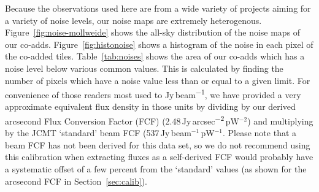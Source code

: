 \documentclass[twocolumn,times]{aastex6}
\newcommand{\jyas}{Jy\,arcsec\textsuperscript{$-$2}}
\begin{document}
Because the observations used here are from a wide variety of projects
aiming for a variety of noise levels, our noise maps are extremely
heterogenous. Figure~\ref{fig:noise-mollweide} shows the all-sky
distribution of the noise maps of our
co-adds. Figure~\ref{fig:histonoise} shows a histogram of the noise in
each pixel of the co-added tiles. Table~\ref{tab:noises} shows the area
of our co-adds which has a noise level below various common
values. This is calculated by finding the number of pixels which have
a noise value less than or equal to a given limit. For convenience of
those readers most used to Jy\,beam\textsuperscript{$-1$}, we have
provided a very approximate equivalent flux density in those units by
dividing by our derived arcsecond Flux Conversion Factor (FCF)
(2.48\,\jyas\,pW$^{-2}$) and multiplying by the JCMT `standard' beam FCF
(537\,Jy\,beam$^{-1}$\,pW$^{-1}$. Please note that a beam FCF has not been
derived for this data set, so we do not recommend using this
calibration when extracting fluxes as a self-derived FCF would
probably have a systematic offset of a few percent from the `standard'
values (as shown for the arcsecond FCF in Section~\ref{sec:calib}).
\end{document}
